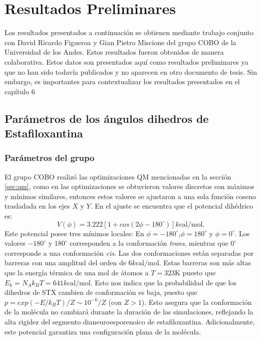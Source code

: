 \chapter{Resultados Preliminares}
Los resultados presentados a continuaci\'{o}n se obtienen mediante trabajo conjunto con David Ricardo Figueroa y Gian Pietro Miscione del grupo COBO de la Universidad de los Andes. Estos resultados fueron obtenidos de manera colaborativa. Estos datos son presentados aqu\'{i} como resultados preliminares ya que no han sido todav\'{i}a publicados y no aparecen en otro documento de tesis. Sin embargo, es importantes para contextualizar los resultados presentados en el cap\'{i}tulo 6\\
\section{Par\'{a}metros de los \'{a}ngulos dihedros de Estafiloxantina}
\subsection*{Par\'{a}metros del grupo }
El grupo COBO realiz\'{o} las optimizaciones QM mencionadas en la secci\'{o}n \ref{sec:qm}, como en las optimizaciones se obtuvieron valores discretos con m\'{a}ximos y m\'{i}nimos similares, entonces estos valores se ajustaron a una sola funci\'{o}n coseno trasladada en los ejes $X$ y $Y$. En el ajuste se encuentra que el potencial dih\'{e}drico es:
\begin{equation}
    V(\phi)=3.222 \left[1+cos(2\phi-180^{\circ})\right]k\mathrm{cal/mol}.
\end{equation}
Este potencial posee tres m\'{i}nimos locales: En $\phi=-180^{\circ}$,$\phi=180^{\circ}$ y $\phi=0^{\circ}$. Los valores $-180^{\circ}$ y $180^{\circ}$ corresponden a la conformaci\'{o}n \textit{trans}, mientras que $0^{\circ}$ corresponde a una conformaci\'{o}n \textit{cis}. Las dos conformaciones est\'{a}n separadas por barreras con una amplitud del orden de $6k\mathrm{cal/mol}$. Estas barreras son m\'{a}s altas que la energ\'{i}a t\'{e}rmica de una mol de \'{a}tomos a $T=323$K puesto que $E_{k}=N_{A}k_{B}T=641k\mathrm{cal/mol}$. Esto nos indica que la probabilidad de que los dihedros de STX cambien de conformaci\'{o}n es baja, puesto que $p=exp(-E/k_{B}T)/Z\sim10^{-6}/Z$ (con $Z>1$). Esto asegura que la conformaci\'{o}n de la mol\'{e}cula no cambiar\'{a} durante la duraci\'{o}n de las simulaciones, reflejando la alta rigidez del segmento dianeuroesporenoico de estafiloxantina. Adicionalmente, este potencial garantiza una configuraci\'{o}n plana de la mol\'{e}cula.

